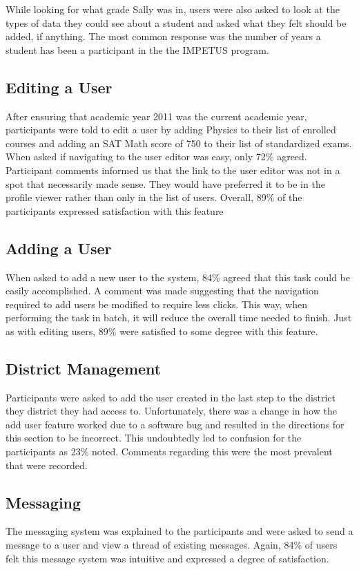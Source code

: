 While looking for what grade Sally was in, users were also asked to look at the types of data they could see about a student and asked what they felt should be added, if anything. The most common response was the number of years a student has been a participant in the the IMPETUS program.

\subsection*{Editing a User}
After ensuring that academic year 2011 was the current academic year, participants were told to edit a user by adding Physics to their list of enrolled courses and adding an SAT Math score of 750 to their list of standardized exams. When asked if navigating to the user editor was easy, only 72\% agreed. Participant comments informed us that the link to the user editor was not in a spot that necessarily made sense. They would have preferred it to be in the profile viewer rather than only in the list of users. Overall, 89\% of the participants expressed satisfaction with this feature

\subsection*{Adding a User}
When asked to add a new user to the system, 84\% agreed that this task could be easily accomplished. A comment was made suggesting that the navigation required to add users be modified to require less clicks. This way, when performing the task in batch, it will reduce the overall time needed to finish. Just as with editing users, 89\% were satisfied to some degree with this feature.

\subsection*{District Management}
Participants were asked to add the user created in the last step to the district they district they had access to. Unfortunately, there was a change in how the add user feature worked due to a software bug and resulted in the directions for this section to be incorrect. This undoubtedly led to confusion for the participants as 23\% noted. Comments regarding this were the most prevalent that were recorded.

\subsection*{Messaging}
The messaging system was explained to the participants and were asked to send a message to a user and view a thread of existing messages. Again, 84\% of users felt this message system was intuitive and expressed a degree of satisfaction.

